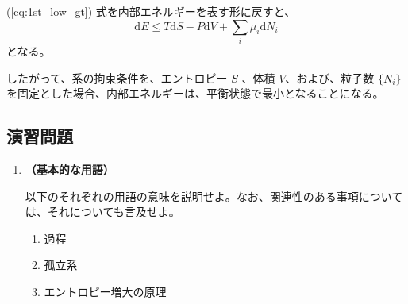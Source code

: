 \documentclass[uplatex,dvipdfmx,a4paper,11pt]{jsarticle}
\newcommand{\diff}{\mathrm d}
\begin{document}
(\ref{eq:1st_low_gt}) 式を内部エネルギーを表す形に戻すと、
\begin{equation}
\diff E \leq T \diff S - P \diff V + \sum_i \mu_i \diff N_i
\label{eq:1st_low_der2}
\end{equation}	
となる。

したがって、系の拘束条件を、エントロピー $S$ 、体積 $V$、および、粒子数 $\{N_i \} $ を固定とした場合、内部エネルギーは、平衡状態で最小となることになる。


\subsection{演習問題}

\begin{enumerate}

\item
{\bf （基本的な用語）}

以下のそれぞれの用語の意味を説明せよ。なお、関連性のある事項については、それについても言及せよ。

\begin{enumerate}

\item
過程

%
%
%

\item
孤立系

%

\item
エントロピー増大の原理

%


\end{enumerate}
\end{enumerate}
\end{document}
